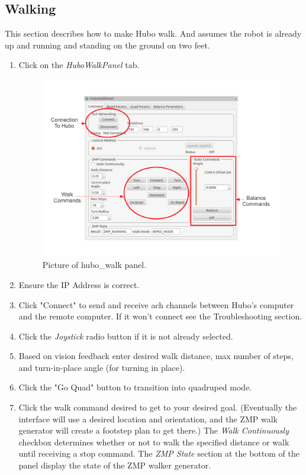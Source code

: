 \documentclass[letterpaper, 10 pt]{report}
\begin{document}
\subsection{Walking}
This section describes how to make Hubo walk. And assumes the robot is already up and running and standing on the ground on two feet.
  \begin{enumerate}
    \item Click on the \textit{HuboWalkPanel} tab.
    \begin{figure}[ht]
      \centering
      \includegraphics[width=15.0cm]{figures/hubo-walk.pdf}
      \caption{Picture of hubo\_walk panel.}
      \label{fig:hubo-walk-image}
    \end{figure}
    \item Ensure the IP Address is correct.
    \item Click "Connect" to send and receive ach channels between Hubo's computer and the remote computer. If it won't connect see the Troubleshooting section.
    \item Click the \textit{Joystick} radio button if it is not already selected.
    \item Based on vision feedback enter desired walk distance, max number of steps, and turn-in-place angle (for turning in place).
    \item Click the "Go Quad" button to transition into quadruped mode.
    \item Click the walk command desired to get to your desired goal. (Eventually the interface will use a desired location and orientation, and the ZMP walk generator will create a footstep plan to get there.) The \textit{Walk Continuously} checkbox determines whether or not to walk the specified distance or walk until receiving a stop command. The \textit{ZMP State} section at the bottom of the panel display the state of the ZMP walker generator.

\end{enumerate}
\end{document}
